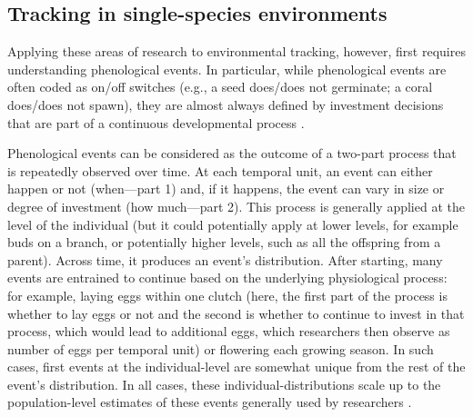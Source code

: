 \documentclass[11pt,letterpaper]{article}
\begin{document}
\subsection{Tracking in single-species environments}
Applying these areas of research to environmental tracking, however, first requires understanding phenological events. In particular, while phenological events are often coded as on/off switches (e.g., a seed does/does not germinate; a coral does/does not spawn), they are almost always defined by investment decisions that are part of a continuous developmental process \citep{inouye2019}. 

Phenological events can be considered as the outcome of a two-part process that is repeatedly observed over time. At each temporal unit, an event can either happen or not (when---part 1) and, if it happens, the event can vary in size or degree of investment (how much---part 2). This process is generally applied at the level of the individual (but it could potentially apply at lower levels, for example buds on a branch, or potentially higher levels, such as all the offspring from a parent). Across time, it produces an event's distribution. After starting, many events are entrained to continue based on the underlying physiological process: for example, laying eggs within one clutch (here, the first part of the process is whether to lay eggs or not and the second is whether to continue to invest in that process, which would lead to additional eggs, which researchers then observe as number of eggs per temporal unit) or flowering each growing season. In such cases, first events at the individual-level are somewhat unique from the rest of the event's distribution. In all cases, these individual-distributions scale up to the population-level estimates of these events generally used by researchers \citep[see][for discussion of the outcomes of this scaling]{inouye2019}.
\end{document}
